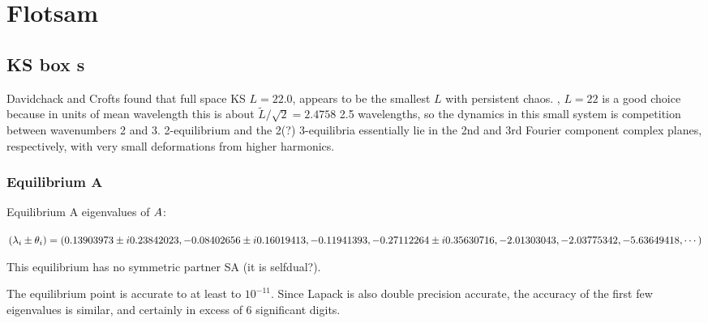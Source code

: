 %

\section{Flotsam}


\subsection{KS box {\rpo s}}

Davidchack and Crofts found that full space KS $L = 22.0$, 
appears to be the smallest $L$ with persistent chaos.  
, $L=22$ is a good choice because in units of mean wavelength
this is about $ \tilde{L}/\sqrt{2}= 2.4758$
2.5 wavelengths, so the 
dynamics in this small system is competition between wavenumbers
2 and 3. 2-equilibrium and the 2(?) 3-equilibria essentially lie in
the 2nd and 3rd Fourier component complex planes, respectively, with very
small deformations from higher harmonics.


\subsubsection{Equilibrium A}

Equilibrium A eigenvalues of ${A}$:

$(\lambda_i \pm \theta_i)
=(
  0.13903973 \pm i 0.23842023,
 -0.08402656 \pm i 0.16019413,
 -0.11941393, 
 -0.27112264 \pm i 0.35630716,
 -2.01303043,
 -2.03775342,
 -5.63649418,
\cdots
)$

This equilibrium has no symmetric partner SA (it is selfdual?).


The equilibrium point is accurate to at least to $10^{-11}$. Since
Lapack is also double precision accurate, the accuracy of the first
few eigenvalues is similar, and certainly in
excess of 6 significant digits.



